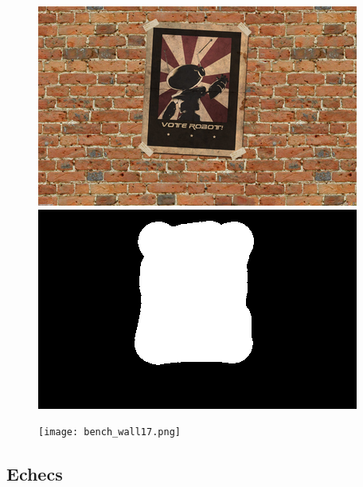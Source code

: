 \documentclass[a4paper, 10pt]{article}
\begin{document}
\begin{figure}[H]
\begin{minipage}{.4\textwidth}
\centering
\includegraphics[scale=0.35]{images/wall.png}
\end{minipage}%
\begin{minipage}{.4\textwidth}
\centering
\includegraphics[scale=0.35]{images/wall_mask.png}
\end{minipage}%
\begin{minipage}{.4\textwidth}
\centering
\texttt{[image: bench\_wall17.png]}
\end{minipage}%
\end{figure}

\subsection{Echecs}
\end{document}
